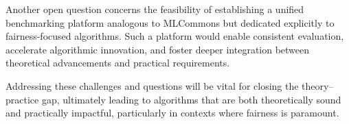 Another open question concerns the feasibility of establishing a
unified benchmarking platform analogous to MLCommons but dedicated
explicitly to fairness-focused algorithms. Such a platform would
enable consistent evaluation, accelerate algorithmic innovation, and
foster deeper integration between theoretical advancements and
practical requirements.

Addressing these challenges and questions will be vital for closing
the theory–practice gap, ultimately leading to algorithms that are
both theoretically sound and practically impactful, particularly in
contexts where fairness is paramount.
